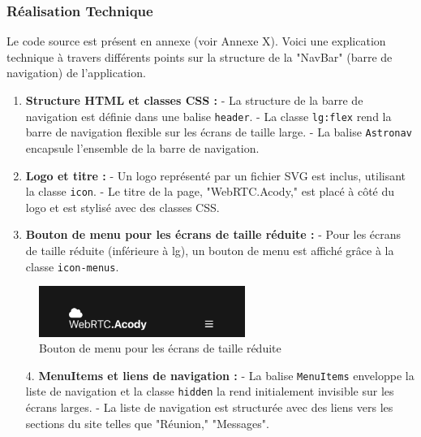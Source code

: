 \documentclass[12pt, a4paper, oneside]{thesis}
\begin{document}
\subsubsection{Réalisation Technique}
Le code source est présent en annexe (voir Annexe X). Voici une explication technique à travers différents points sur la structure de la "NavBar" (barre de navigation) de l'application.

\begin{enumerate}
    \item \textbf{Structure HTML et classes CSS :}
    - La structure de la barre de navigation est définie dans une balise \texttt{header}.
    - La classe \texttt{lg:flex} rend la barre de navigation flexible sur les écrans de taille large.
    - La balise \texttt{Astronav} encapsule l'ensemble de la barre de navigation.

    \item \textbf{Logo et titre :}
    - Un logo représenté par un fichier SVG est inclus, utilisant la classe \texttt{icon}.
    - Le titre de la page, "WebRTC.Acody," est placé à côté du logo et est stylisé avec des classes CSS.

    \item \textbf{Bouton de menu pour les écrans de taille réduite :}
    - Pour les écrans de taille réduite (inférieure à lg), un bouton de menu est affiché grâce à la classe \texttt{icon-menus}.

\end{enumerate}

\begin{figure}[h]
    \centering
    \includegraphics[width=0.6\textwidth]{images/NavBarMobileClose.png}
    \caption{Bouton de menu pour les écrans de taille réduite}
\end{figure}

\begin{enumerate}
    \item[4.] \textbf{MenuItems et liens de navigation :}
    - La balise \texttt{MenuItems} enveloppe la liste de navigation et la classe \texttt{hidden} la rend initialement invisible sur les écrans larges.
    - La liste de navigation est structurée avec des liens vers les sections du site telles que "Réunion," "Messages".

\end{enumerate}
\end{document}
